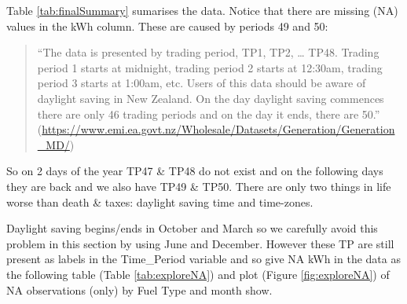 \documentclass[]{article}
\theoremstyle{definition}
\theoremstyle{definition}
\theoremstyle{definition}
\theoremstyle{remark}
\begin{document}
Table \ref{tab:finalSummary} sumarises the data. Notice that there are
missing (NA) values in the kWh column. These are caused by periods 49
and 50:

\begin{quote}
``The data is presented by trading period, TP1, TP2, \ldots{} TP48.
Trading period 1 starts at midnight, trading period 2 starts at 12:30am,
trading period 3 starts at 1:00am, etc. Users of this data should be
aware of daylight saving in New Zealand. On the day daylight saving
commences there are only 46 trading periods and on the day it ends,
there are 50.''
(\url{https://www.emi.ea.govt.nz/Wholesale/Datasets/Generation/Generation_MD/})
\end{quote}

So on 2 days of the year TP47 \& TP48 do not exist and on the following
days they are back and we also have TP49 \& TP50. There are only two
things in life worse than death \& taxes: daylight saving time and
time-zones.

Daylight saving begins/ends in October and March so we carefully avoid
this problem in this section by using June and December. However these
TP are still present as labels in the Time\_Period variable and so give
NA kWh in the data as the following table (Table \ref{tab:exploreNA})
and plot (Figure \ref{fig:exploreNA}) of NA observations (only) by Fuel
Type and month show.
\end{document}
